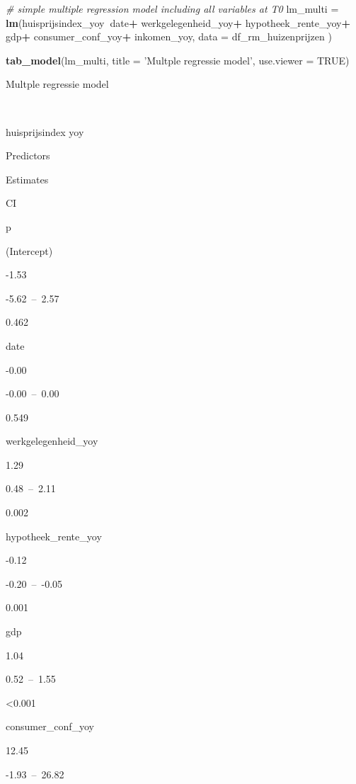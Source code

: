 \documentclass[
]{article}
\newenvironment{Shaded}{\begin{snugshade}}{\end{snugshade}}
\newcommand{\CommentTok}[1]{\textcolor[rgb]{0.56,0.35,0.01}{\textit{#1}}}
\newcommand{\DataTypeTok}[1]{\textcolor[rgb]{0.13,0.29,0.53}{#1}}
\newcommand{\KeywordTok}[1]{\textcolor[rgb]{0.13,0.29,0.53}{\textbf{#1}}}
\newcommand{\NormalTok}[1]{#1}
\newcommand{\OperatorTok}[1]{\textcolor[rgb]{0.81,0.36,0.00}{\textbf{#1}}}
\newcommand{\OtherTok}[1]{\textcolor[rgb]{0.56,0.35,0.01}{#1}}
\newcommand{\StringTok}[1]{\textcolor[rgb]{0.31,0.60,0.02}{#1}}
\begin{document}
\begin{Shaded}
\begin{Highlighting}[]
\CommentTok{# simple multiple regression model including all variables at T0}
\NormalTok{lm_multi =}\StringTok{ }\KeywordTok{lm}\NormalTok{(huisprijsindex_yoy}\OperatorTok{~}\NormalTok{date}\OperatorTok{+}
\StringTok{                }\NormalTok{werkgelegenheid_yoy}\OperatorTok{+}
\StringTok{                }\NormalTok{hypotheek_rente_yoy}\OperatorTok{+}
\StringTok{                }\NormalTok{gdp}\OperatorTok{+}
\StringTok{                }\NormalTok{consumer_conf_yoy}\OperatorTok{+}
\StringTok{                }\NormalTok{inkomen_yoy, }\DataTypeTok{data =}\NormalTok{ df_rm_huizenprijzen )}

\KeywordTok{tab_model}\NormalTok{(lm_multi,}
          \DataTypeTok{title =} \StringTok{'Multple regressie model'}\NormalTok{,}
          \DataTypeTok{use.viewer =} \OtherTok{TRUE}\NormalTok{)}
\end{Highlighting}
\end{Shaded}

Multple regressie model

~

huisprijsindex yoy

Predictors

Estimates

CI

p

(Intercept)

-1.53

-5.62~--~2.57

0.462

date

-0.00

-0.00~--~0.00

0.549

werkgelegenheid\_yoy

1.29

0.48~--~2.11

0.002

hypotheek\_rente\_yoy

-0.12

-0.20~--~-0.05

0.001

gdp

1.04

0.52~--~1.55

\textless0.001

consumer\_conf\_yoy

12.45

-1.93~--~26.82
\end{document}
